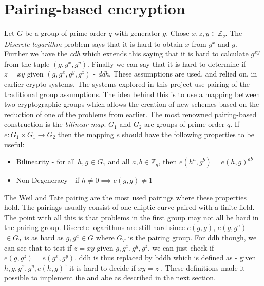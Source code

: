 \section{Pairing-based encryption}
Let $G$ be a group of prime order $q$ with generator $g$. Chose $x,z,y \in \mathbb{Z}_q$. The \emph{Discrete-logarithm} problem says that it is hard to obtain $x$ from $g^x$ and $g$. Further we have the \emph{\gls{cdh}} which extends this saying that it is hard to calculate $g^{xy}$ from the tuple $(g, g^x, g^y)$. Finally we can say that it is hard to determine if $z=xy$ given $(g, g^x, g^y, g^z)$ - \emph{\gls{ddh}}. These assumptions are used, and relied on, in earlier crypto systems. The systems explored in this project use pairing of the traditional group assumptions. The idea behind this is to use a mapping between two cryptographic groups which allows the creation of new schemes based on the reduction of one of the problems from earlier. The most renowned pairing-based construction is the \emph{bilinear map}. $G_1$ and $G_2$ are groups of prime order $q$. If $e: G_1 \times G_1 \rightarrow G_2$ then the mapping $e$ should have the following properties to be useful: 
\begin{itemize}
\item Bilinearity - for all $h, g \in G_1$ and all $a,b \in \mathbb{Z}_q$, then $e(h^a, g^b) = e(h, g)^{ab}$
\item Non-Degeneracy - if $h \neq 0 \implies e(g,g) \neq 1$
\end{itemize}
The Weil and Tate pairing are the most used pairings where these properties hold. The pairings usually consist of one elliptic curve paired with a finite field. 
The point with all this is that problems in the first group may not all be hard in the pairing group. Discrete-logarithms are still hard since $e(g,g)$, $e(g,g^a)$ $\in G_T$ is as hard as $g,g^a \in G$ where $G_T$ is the pairing group.
For \gls{ddh} though, we can see that to test if $z=xy$ given $g, g^x, g^y, g^z$, we can just check if $e(g, g^z) = e(g^x, g^y)$. \Gls{ddh} is thus replaced by \gls{bddh} which is defined as - given $h, g, g^x, g^y, e(h,g)^z$ it is hard to decide if $xy = z$ \cite{pairing-survey}. These definitions made it possible to implement \gls{ibe} and \gls{abe} as described in the next section.

